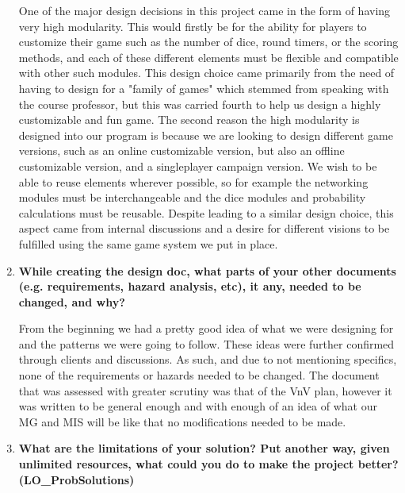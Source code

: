 \documentclass[12pt, titlepage]{article}
\begin{document}
\begin{enumerate}
  One of the major design decisions in this project came in the form of having very high modularity. This would firstly be for the ability for players to customize their game such as the number of dice, round timers, or the scoring methods, and each of these different elements must be flexible and compatible with other such modules. This design choice came primarily from the need of having to design for a "family of games" which stemmed from speaking with the course professor, but this was carried fourth to help us design a highly customizable and fun game. The second reason the high modularity is designed into our program is because we are looking to design different game versions, such as an online customizable version, but also an offline customizable version, and a singleplayer campaign version. We wish to be able to reuse elements wherever possible, so for example the networking modules must be interchangeable and the dice modules and probability calculations must be reusable. Despite leading to a similar design choice, this aspect came from internal discussions and a desire for different visions to be fulfilled using the same game system we put in place.
  
  \item \textbf{While creating the design doc, what parts of your other documents (e.g.
  requirements, hazard analysis, etc), it any, needed to be changed, and why?}

  From the beginning we had a pretty good idea of what we were designing for and the patterns we were going to follow. These ideas were further confirmed through clients and discussions. As such, and due to not mentioning specifics, none of the requirements or hazards needed to be changed. The document that was assessed with greater scrutiny was that of the VnV plan, however it was written to be general enough and with enough of an idea of what our MG and MIS will be like that no modifications needed to be made.

  \item \textbf{What are the limitations of your solution?  Put another way, given
  unlimited resources, what could you do to make the project better? (LO\_ProbSolutions)}


\end{enumerate}
\end{document}
